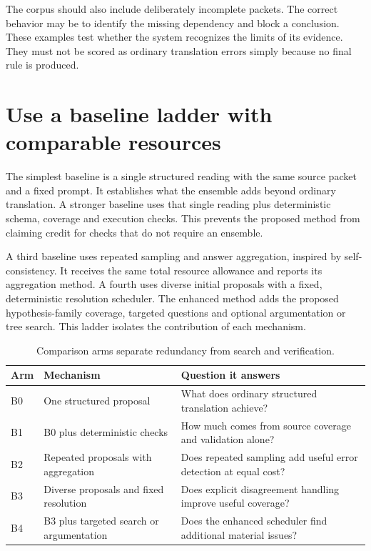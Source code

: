 \documentclass[12pt,a4paper,oneside,openany]{book}
\begin{document}
The corpus should also include deliberately incomplete packets. The correct
behavior may be to identify the missing dependency and block a conclusion. These
examples test whether the system recognizes the limits of its evidence. They
must not be scored as ordinary translation errors simply because no final rule
is produced.

\section{Use a baseline ladder with comparable resources}

The simplest baseline is a single structured reading with the same source packet
and a fixed prompt. It establishes what the ensemble adds beyond ordinary
translation. A stronger baseline uses that single reading plus deterministic
schema, coverage and execution checks. This prevents the proposed method from
claiming credit for checks that do not require an ensemble.

A third baseline uses repeated sampling and answer aggregation, inspired by
self-consistency. It receives the same total resource allowance and reports its
aggregation method. A fourth uses diverse initial proposals with a fixed,
deterministic resolution scheduler. The enhanced method adds the proposed
hypothesis-family coverage, targeted questions and optional argumentation or tree
search. This ladder isolates the contribution of each mechanism.

\begin{table}[htbp]
\centering\small
\caption{Comparison arms separate redundancy from search and verification.}
\begin{tabularx}{\textwidth}{P{16mm}YY}
\toprule
Arm & Mechanism & Question it answers\\
\midrule
B0 & One structured proposal & What does ordinary structured translation achieve?\\
B1 & B0 plus deterministic checks & How much comes from source coverage and validation alone?\\
B2 & Repeated proposals with aggregation & Does repeated sampling add useful error detection at equal cost?\\
B3 & Diverse proposals and fixed resolution & Does explicit disagreement handling improve useful coverage?\\
B4 & B3 plus targeted search or argumentation & Does the enhanced scheduler find additional material issues?\\
\bottomrule
\end{tabularx}
\end{table}
\end{document}
